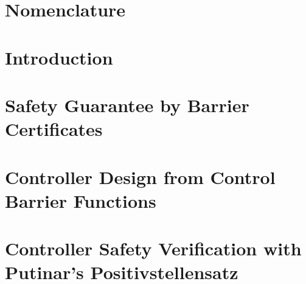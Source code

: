 
\graphicspath{{figures/}}


	






\setcounter{page}{1}
\renewcommand{\thepage}{\Roman{page}}




\setlength\parskip{0ex}
\tableofcontents
\setlength\parskip{1ex}

\chapter*{Nomenclature}\label{chap:acronym}
\printglossary[style=mcoltree,title=Glossary] %
\printglossary[type=\acronymtype,style=glossary2col] %
\printglossary[type=symbols,style=altlong4col] %
\clearpage



\cleardoublepage
\setcounter{page}{1}
\renewcommand{\thepage}{\arabic{page}}

\chapter{Introduction}\label{chap:intro}



\chapter{Safety Guarantee by Barrier Certificates}\label{chap:barrier_cerificates}
	
\chapter{Controller Design from Control Barrier Functions}\label{chap:cbf}
	
\chapter[Controller Safety Verification with Putinar's Positivstellensatz]{Controller Safety Verification with \\Putinar's Positivstellensatz}\label{chap:putinar}  %
	

